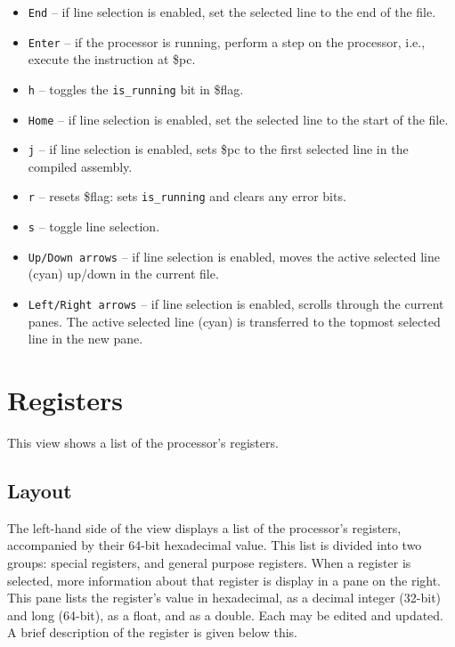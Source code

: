 \documentclass[10pt]{article}
\begin{document}
    \begin{itemize}
        \item \texttt{End} -- if line selection is enabled, set the selected line to the end of the file.
        \item \texttt{Enter} -- if the processor is running, perform a step on the processor, i.e., execute the instruction at \$pc.
        \item \texttt{h} -- toggles the \texttt{is\_running} bit in \$flag.
        \item \texttt{Home} -- if line selection is enabled, set the selected line to the start of the file.
        \item \texttt{j} -- if line selection is enabled, sets \$pc to the first selected line in the compiled assembly.
        \item \texttt{r} -- resets \$flag: sets \texttt{is\_running} and clears any error bits.
        \item \texttt{s} -- toggle line selection.
        \item \texttt{Up/Down arrows} -- if line selection is enabled, moves the active selected line (cyan) up/down in the current file.
        \item \texttt{Left/Right arrows} -- if line selection is enabled, scrolls through the current panes.
        The active selected line (cyan) is transferred to the topmost selected line in the new pane.
    \end{itemize}

    \section{Registers}

    This view shows a list of the processor's registers.

    \subsection{Layout}

    The left-hand side of the view displays a list of the processor's registers, accompanied by their 64-bit hexadecimal value.
    This list is divided into two groups: special registers, and general purpose registers.
    When a register is selected, more information about that register is display in a pane on the right.
    This pane lists the register's value in hexadecimal, as a decimal integer (32-bit) and long (64-bit), as a float, and as a double.
    Each may be edited and updated.
    A brief description of the register is given below this.
\end{document}
